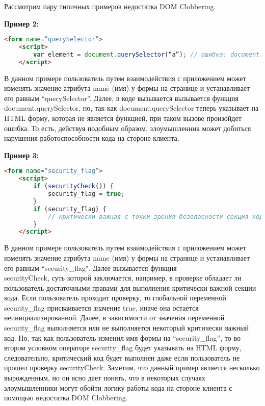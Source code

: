 Рассмотрим пару типичных примеров недостатка DOM Clobbering.

\bigskip
\textbf{Пример 2:}


\begin{lstlisting}[language=HTML]
	<form name=“querySelector”>
	<script>
		var element = document.querySelector(“a”); // ошибка: document.querySelector указывает на <form name=“querySelector”
	</script>
\end{lstlisting}
\bigskip

В данном примере пользователь путем взаимодействия с приложением может изменять значение атрибута name (имя) у формы на странице и устанавливает его равным “querySelector”. Далее, в коде вызывается вызывается функция document.querySelector, но, так как document.querySelector теперь указывает на HTML форму, которая не является функцией, при таком вызове произойдет ошибка.
То есть, действуя подобным образом, злоумышленник может добиться нарушения работоспособности кода на стороне клиента.

\bigskip
\textbf{Пример 3:}

\begin{lstlisting}[language=HTML]
	<form name=“security_flag”>
	<script>
		if (securityCheck()) {
			security_flag = true;
		}
		if (security_flag) {
			// критически важная с точки зрения безопасности секция кода
		}
	</script>
\end{lstlisting}
\bigskip

В данном примере пользователь путем взаимодействия с приложением может изменять значение атрибута name (имя) у формы на странице и устанавливает его равным “security\_flag". Далее вызывается функция \\securityCheck, суть которой заключается, например, в проверке обладает ли пользователь достаточными правами для выполнения критически важной секции кода. Если пользователь проходит проверку, то глобальной переменной security\_flag присваивается значение true, иначе она остается неинициализированной. Далее, в зависимости от значения переменной security\_flag выполняется или не выполняется некоторый критически важный код. Но, так как пользователь изменил имя формы на “security\_flag”, то во втором условном операторе security\_flag будет указывать на HTML форму, следовательно, критический код будет выполнен даже если пользователь не прошел проверку securityCheck.
Заметим, что данный пример является несколько вырожденным, но он ясно дает понять, что в некоторых случаях злоумышленники могут обойти логику работы кода на стороне клиента с помощью недостатка DOM Clobbering.

